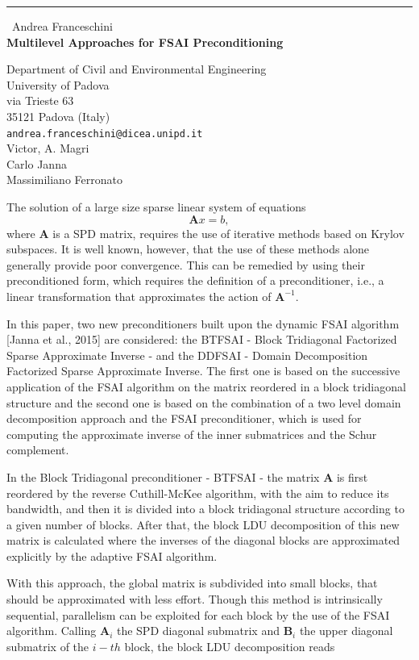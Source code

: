 \documentclass{report}
\begin{document}
\begin{center}
\rule{6in}{1pt} \
{\large Andrea Franceschini \\
{\bf Multilevel Approaches for FSAI Preconditioning}}

Department of Civil and Environmental Engineering \\ University of Padova \\ via Trieste 63 \\ 35121 Padova (Italy)
\\
{\tt andrea.franceschini@dicea.unipd.it}\\
Victor, A. Magri\\
Carlo Janna\\
Massimiliano Ferronato\end{center}

The solution of a large size sparse linear system of equations
\begin{equation}
\mathbf{A} x = b,
\end{equation}
where $\mathbf{A}$ is a SPD matrix, requires the use of iterative methods based on Krylov
subspaces. It is well known, however, that the use of these methods alone generally
provide poor convergence. This can be remedied by using their preconditioned form, which
requires the definition of a preconditioner, i.e., a linear transformation that
approximates the action of $\mathbf{A}^{-1}$.

In this paper, two new preconditioners built upon the dynamic FSAI algorithm
[Janna et al., 2015] are considered: the BTFSAI - Block Tridiagonal Factorized Sparse
Approximate Inverse - and the DDFSAI - Domain Decomposition Factorized Sparse Approximate
Inverse. The first one is based on the successive application of the FSAI
algorithm on the
matrix reordered in a block tridiagonal structure and the second one is based on the
combination of a two level domain decomposition approach and the FSAI preconditioner,
which is used for computing the approximate inverse of the inner
submatrices and the Schur
complement.

In the Block Tridiagonal preconditioner - BTFSAI - the matrix $\mathbf{A}$ is first
reordered by the reverse Cuthill-McKee algorithm, with the aim to reduce its bandwidth,
and then it is divided into a block tridiagonal structure according to a given number
of blocks. After that, the block LDU decomposition of this new matrix is calculated
where the inverses of the diagonal blocks are approximated explicitly by the adaptive
FSAI algorithm.

With this approach, the global matrix is subdivided into small blocks, that should be
approximated with less effort. Though this method is intrinsically sequential,
parallelism can be exploited for each block by the use of the FSAI algorithm.
Calling $\mathbf{A}_i$ the SPD diagonal submatrix and $\mathbf{B}_i$ the upper diagonal
submatrix of the $i-th$ block, the block LDU decomposition reads
\end{document}

